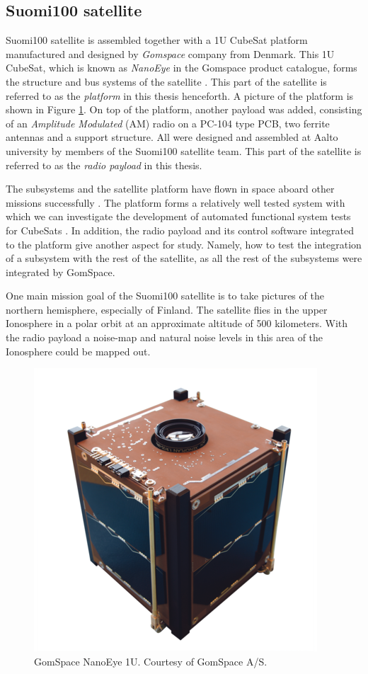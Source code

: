 \documentclass[english,12pt,a4paper,pdftex,elec,utf8]{aaltothesis}
\begin{document}
\subsection{Suomi100 satellite}
Suomi100 satellite is assembled together with a 1U CubeSat platform manufactured and designed by \textit{Gomspace} company from Denmark. This 1U CubeSat, which is known as \textit{NanoEye} in the Gomspace product catalogue, forms the structure and bus systems of the satellite \cite{gomspaceweb}. This part of the satellite is referred to as the \textit{platform} in this thesis henceforth. A picture of the platform is shown in Figure \ref{nanoeye}. On top of the platform, another payload was added, consisting of an \textit{Amplitude Modulated} (AM) radio on a PC-104 type PCB, two ferrite antennas and a support structure. All were designed and assembled at Aalto university by members of the Suomi100 satellite team. This part of the satellite is referred to as the \textit{radio payload} in this thesis.\par
The subsystems and the satellite platform have flown in space aboard other missions successfully \cite{nasasmallsatstate}. The platform forms a relatively well tested system with which we can investigate the development of automated functional system tests for CubeSats \cite{nasasmallsatstate}. In addition, the radio payload and its control software integrated to the platform give another aspect for study. Namely, how to test the integration of a subsystem with the rest of the satellite, as all the rest of the subsystems were integrated by GomSpace.\par
One main mission goal of the Suomi100 satellite is to take pictures of the northern hemisphere, especially of Finland. The satellite flies in the upper Ionosphere in a polar orbit at an approximate altitude of 500 kilometers. With the radio payload a noise-map and natural noise levels in this area of the Ionosphere could be mapped out. 
\begin{center}
\begin{figure}[h!]
\centering
\includegraphics[scale=0.5]{nanoeye}
\caption{GomSpace NanoEye 1U. Courtesy of GomSpace A/S. \cite{gomspaceweb}}
\label{nanoeye}
\end{figure}
\end{center}
\end{document}
